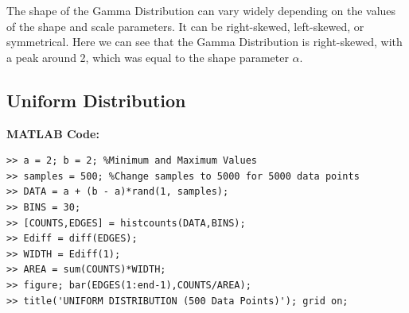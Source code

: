 \documentclass{article}
\theoremstyle{mytheoremstyle}
\theoremstyle{mytheoremstyle}
\theoremstyle{myproblemstyle}
\begin{document}
The shape of the Gamma Distribution can vary widely depending on the values of the shape and scale parameters. It can be right-skewed, left-skewed, or symmetrical. Here we can see that the Gamma Distribution is right-skewed, with a peak around 2, which was equal to the shape parameter $\alpha$.

\newpage
\subsection*{Uniform Distribution}

\textbf{MATLAB Code:}
\begin{lstlisting}[caption={Uniform Disttribution},label={Uniform}]
>> a = 2; b = 2; %Minimum and Maximum Values
>> samples = 500; %Change samples to 5000 for 5000 data points
>> DATA = a + (b - a)*rand(1, samples);
>> BINS = 30;
>> [COUNTS,EDGES] = histcounts(DATA,BINS);
>> Ediff = diff(EDGES);
>> WIDTH = Ediff(1);
>> AREA = sum(COUNTS)*WIDTH;
>> figure; bar(EDGES(1:end-1),COUNTS/AREA);
>> title('UNIFORM DISTRIBUTION (500 Data Points)'); grid on;
\end{lstlisting}
\end{document}

